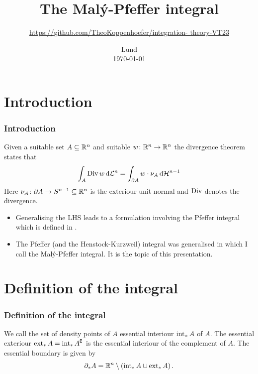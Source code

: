 %




\subject{Specialised course in integration theory, VT23}
\title{The Malý-Pfeffer integral}
\author{\url{https://github.com/TheoKoppenhoefer/integration-
theory-VT23}}
\date{Lund \\[1ex] \today}










\frame[plain]{\titlepage}


\section{Introduction}
\begin{frame}
	\frametitle{Introduction}
	Given a suitable set $A\subseteq\mathbb{R}^n$ and suitable $w\colon\mathbb{R}^n\to\mathbb{R}^n$ the divergence theorem states that
	\begin{align*}
		\int_A\operatorname{Div} w\,\mathrm{d} \mathcal{L}^n=\int_{\partial A}w\cdot\nu_A\,\mathrm{d} \mathcal{H}^{n-1}
	\end{align*}
	Here $\nu_A\colon \partial A\to S^{n-1}\subseteq\mathbb{R}^n$ is the exteriour unit normal and $\operatorname{Div}$ denotes the divergence.
	\begin{itemize}
		\item 
		Generalising the LHS leads to a formulation involving the Pfeffer integral which is defined in \cite{Pfe1991}.
		\item
		The Pfeffer (and the Henstock-Kurzweil) integral was generalised in \cite{Pfe2016} which I call the Malý-Pfeffer integral. It is the topic of this presentation.
	\end{itemize}
\end{frame}

\section{Definition of the integral}

\begin{frame}
	\frametitle{Definition of the integral}
	\begin{definition}
	We call the set of density points of $A$ essential interiour $\operatorname{int}_*A$ of $A$.
	The essential exteriour $\operatorname{ext}_*A=\operatorname{int}_*A^\complement$ is the essential interiour of the complement of $A$. The essential boundary is given by
	\begin{align*}
		\partial_*A=\mathbb{R}^n\setminus(\operatorname{int}_*A\cup\operatorname{ext}_*A)\,.
	\end{align*}
	\end{definition}
\end{frame}

